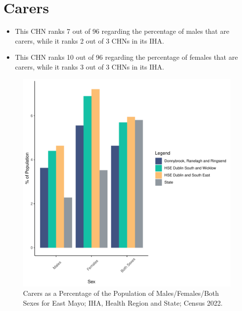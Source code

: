 \documentclass{article}
\begin{document}
\section{Carers}\label{sect:Carers}
\begin{itemize}
\item This CHN ranks  7 out of 96 regarding the percentage of males that are carers, while it ranks   2 out of 3 CHNs in its IHA.
\item This CHN ranks  10 out of 96 regarding the percentage of females that are carers, while it ranks   3 out of 3 CHNs in its IHA.
\end{itemize}
\begin{figure}[H]
	\centering
	\includegraphics[width = 150mm]{../figures/CareED.pdf}
	\caption{Carers as a Percentage of the Population of Males/Females/Both Sexes for East Mayo; IHA, Health Region and State; Census 2022.}
	\label{fig:2ae19629-1a6a-13a3-e055-000000000001}
	\end{figure}
\end{document}
